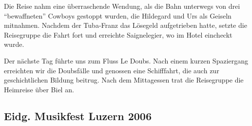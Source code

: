 \begin{history}
    Die Reise nahm eine überraschende Wendung, als die Bahn unterwegs von drei
    \enquote{bewaffneten} Cowboys gestoppt wurden, die Hildegard und Urs als
    Geiseln mitnahmen. Nachdem der Tuba-Franz das Lösegeld aufgetrieben hatte,
    setzte die Reisegruppe die Fahrt fort und erreichte Saignelegier, wo im
    Hotel eincheckt wurde.

    Der nächste Tag führte uns zum Fluss Le Doubs. Nach einem kurzen Spaziergang
    erreichten wir die Doubsfälle und genossen eine Schifffahrt, die auch zur
    geschichtlichen Bildung beitrug. Nach dem Mittagessen trat die Reisegruppe
    die Heimreise über Biel an.

\end{history}

\subsection*{Eidg. Musikfest Luzern 2006}

